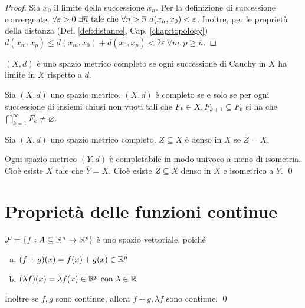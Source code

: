 \begin{proof}
    Sia $x_0$ il limite della successione $x_n$. Per la definizione di successione convergente, $\forall \varepsilon > 0 \ \exists \overline{n} \text{ tale che } \forall n>\overline{n}\ d(x_n,x_0) < \varepsilon$. Inoltre, per le proprietà della distanza (Def. \ref{def:distance}, Cap. \ref{chap:topology}) $d(x_m,x_p)\leq d(x_m,x_0)+d(x_0,x_p) < 2\varepsilon \ \forall m,p \geq \overline{n}$.
\end{proof}

\begin{definition}
    $(X, d)$ è uno spazio metrico completo se ogni successione di Cauchy in $X$ ha limite in $X$ rispetto a $d$.
\end{definition}

\begin{theorem}
    Sia $(X,d)$ uno spazio metrico. $(X,d)$ è completo se e solo se per ogni successione di insiemi chiusi non vuoti tali che $F_k \in X, F_{k+1}\subseteq F_k$ si ha che $\bigcap\limits_{k=1}^{\infty}F_k\neq\varnothing$.
\end{theorem}

\begin{definition}
    Sia $(X,d)$ uno spazio metrico completo. $Z \subseteq X$ è denso in $X$ se $\overline{Z} = X$.
\end{definition}

\begin{theorem}
    Ogni spazio metrico $(Y,d)$ è completabile in modo univoco a meno di isometria. Cioè esiste $X$ tale che $\overline{Y} = X$. Cioè esiste $Z \subseteq X$ denso in $X$ e isometrico a $Y$.
    \qed
\end{theorem}

\section{Proprietà delle funzioni continue}

\begin{theorem}
    $\mathcal{F}=\{f: A \subseteq \mathbb{R}^n \to \mathbb{R}^p\}$ è uno spazio vettoriale, poiché
    \begin{enumerate}[a.]
        \item $(f+g)(x)=f(x)+g(x) \in \mathbb{R}^p$
        \item $(\lambda f)(x)= \lambda f(x) \in \mathbb{R}^p \text{ con } \lambda \in \mathbb{R}$
    \end{enumerate}
    Inoltre se $f,g$ sono continue, allora $f+g, \lambda f$ sono continue.
    \qed
\end{theorem}

